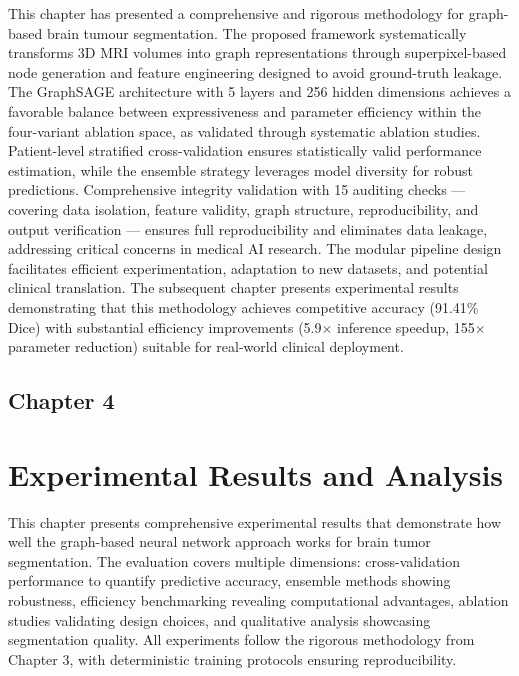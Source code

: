 \documentclass{article}
\begin{document}
This chapter has presented a comprehensive and rigorous methodology for graph-based brain tumour segmentation. The proposed framework systematically transforms 3D MRI volumes into graph representations through superpixel-based node generation and feature engineering designed to avoid ground-truth leakage. The GraphSAGE architecture with 5 layers and 256 hidden dimensions achieves a favorable balance between expressiveness and parameter efficiency within the four-variant ablation space, as validated through systematic ablation studies. Patient-level stratified cross-validation ensures statistically valid performance estimation, while the ensemble strategy leverages model diversity for robust predictions. Comprehensive integrity validation with 15 auditing checks — covering data isolation, feature validity, graph structure, reproducibility, and output verification — ensures full reproducibility and eliminates data leakage, addressing critical concerns in medical AI research. The modular pipeline design facilitates efficient experimentation, adaptation to new datasets, and potential clinical translation. The subsequent chapter presents experimental results demonstrating that this methodology achieves competitive accuracy (91.41\% Dice) with substantial efficiency improvements (5.9$\times$ inference speedup, 155$\times$ parameter reduction) suitable for real-world clinical deployment.

\clearpage


\cleardoublepage
\begin{center}
    \section*{\fontsize{20}{20}\selectfont Chapter 4}
\end{center}
\vspace{10mm}

\section{Experimental Results and Analysis}

This chapter presents comprehensive experimental results that demonstrate how well the graph-based neural network approach works for brain tumor segmentation. The evaluation covers multiple dimensions: cross-validation performance to quantify predictive accuracy, ensemble methods showing robustness, efficiency benchmarking revealing computational advantages, ablation studies validating design choices, and qualitative analysis showcasing segmentation quality. All experiments follow the rigorous methodology from Chapter 3, with deterministic training protocols ensuring reproducibility.
\end{document}
